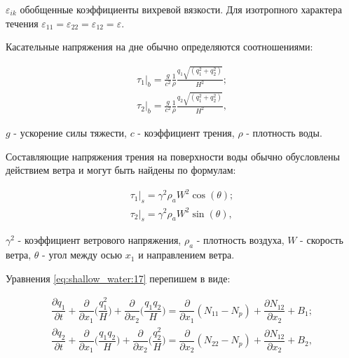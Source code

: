 \documentclass[14pt]{extreport}
\begin{document}
 $\varepsilon_{ik}$ обобщенные коэффициенты вихревой вязкости. Для изотропного характера течения $\varepsilon_{11}=\varepsilon_{22}=\varepsilon_{12}=\varepsilon.$

Касательные напряжения на дне обычно определяются соотношениями:

\begin{equation}\label{eq:shallow_water:20}
\begin{aligned}
\tau_1\bigg|_b = \frac{g}{c^2} \frac{1}{\rho} \frac{q_1\sqrt{(q_1^2+q_2^2)}}{H^2}; \\
\tau_2\bigg|_b = \frac{g}{c^2} \frac{1}{\rho} \frac{q_2\sqrt{(q_1^2+q_2^2)}}{H^2},
\end{aligned}
\end{equation}

 $g$ - ускорение силы тяжести, $c$ - коэффициент трения, $\rho$ - плотность воды. 

Составляющие напряжения трения на поверхности воды обычно обусловлены действием ветра и могут быть найдены по формулам:

\begin{equation}\label{eq:shallow_water:21}
\begin{aligned}
\tau_1\bigg|_s=\gamma^2\rho_aW^2\cos(\theta);\\
\tau_2\bigg|_s=\gamma^2\rho_aW^2\sin(\theta),
\end{aligned}
\end{equation}

 $\gamma^2$ - коэффициент ветрового напряжения, $\rho_a$ - плотность воздуха, $W$ - скорость ветра, $\theta$ - угол между осью $x_1$ и направлением ветра.

Уравнения \ref{eq:shallow_water:17} перепишем в виде:


\begin{equation}\label{eq:shallow_water:22}
\begin{aligned}
\dfrac{\partial q_1}{\partial t} + \dfrac{\partial}{\partial x_1} \bigg(\dfrac{q_1^2}{H}\bigg)+\dfrac{\partial }{\partial x_2}\bigg(\dfrac{q_1 q_2}{H}\bigg) = \dfrac{\partial}{\partial x_1} (N_{11}-N_p) + \dfrac{\partial N_{12}}{\partial x_2} + B_1; \\
\dfrac{\partial q_2}{\partial t} + \dfrac{\partial}{\partial x_1} \bigg(\dfrac{q_1 q_2}{H}\bigg)+\dfrac{\partial }{\partial x_2}\bigg(\dfrac{q_2^2}{H}\bigg) = \dfrac{\partial}{\partial x_2} (N_{22}-N_p) + \dfrac{\partial N_{12}}{\partial x_2} + B_2,
\end{aligned}
\end{equation}
\end{document}
